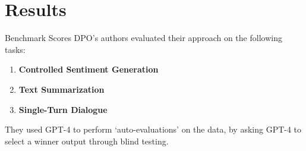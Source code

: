 \documentclass{beamer}
\begin{document}
\section{Results}
\begin{frame}{Benchmark Scores}
	DPO's authors evaluated their approach on the following tasks:
	\begin{enumerate}[label=\arabic*.]
		\item \textbf{Controlled Sentiment Generation}
		\item \textbf{Text Summarization}
		\item \textbf{Single-Turn Dialogue}
	\end{enumerate}
	They used GPT-4 to perform `auto-evaluations' on the data, by asking GPT-4 to select a winner output through blind testing. \pause \newline \\


\end{frame}
\end{document}
